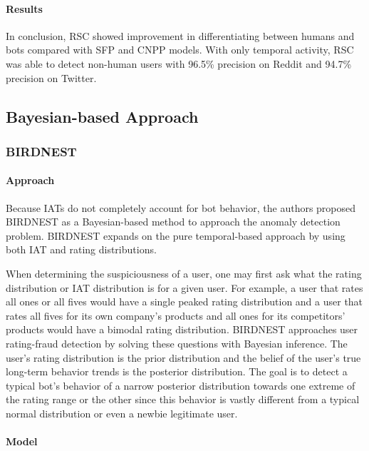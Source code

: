 \documentclass[11pt, oneside]{article}   	%
\begin{document}
\paragraph*{Results}
\quad

\quad In conclusion, RSC showed improvement in differentiating between humans and bots compared with SFP and CNPP models.
With only temporal activity, RSC was able to detect non-human users with 96.5\% precision on Reddit and 94.7\% precision on Twitter.

\subsection{Bayesian-based Approach}
\subsubsection*{BIRDNEST }

\paragraph*{Approach}
\quad

\quad Because IATs do not completely account for bot behavior, the authors proposed BIRDNEST \cite{birdnest} as a Bayesian-based method to approach the anomaly detection problem. 
BIRDNEST expands on the pure temporal-based approach by using both IAT and rating distributions.

\quad When determining the suspiciousness of a user, one may first ask what the rating distribution or IAT distribution is for a given user.
For example, a user that rates all ones or all fives would have a single peaked rating distribution and a user that rates all fives for its own company's products and all ones for its competitors' products would have a bimodal rating distribution.
BIRDNEST approaches user rating-fraud detection by solving these questions with Bayesian inference.
The user's rating distribution is the prior distribution and the belief of the user's true long-term behavior trends is the posterior distribution.
The goal is to detect a typical bot's behavior of a narrow posterior distribution towards one extreme of the rating range or the other since this behavior is vastly different from a typical normal distribution or even a newbie legitimate user.

\paragraph*{Model}
\quad
\end{document}
